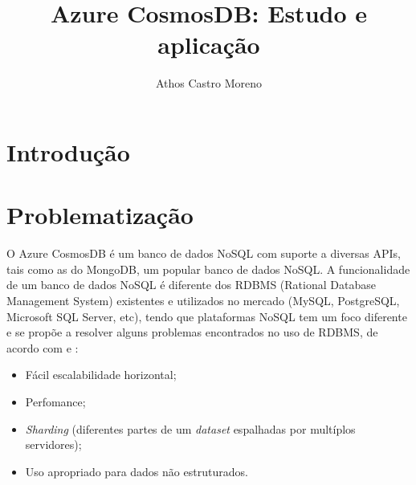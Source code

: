 \documentclass[12pt]{article}
\title{Azure CosmosDB: Estudo e aplicação}
\author{Athos Castro Moreno}
\begin{document}
 

\maketitle
     
\begin{resumo} 
\end{resumo}

\section{Introdução}

\section{Problematização} 

O Azure CosmosDB é um banco de dados NoSQL com suporte a diversas APIs, tais como as do MongoDB, um popular banco de dados NoSQL. A funcionalidade de um banco de dados NoSQL é diferente dos RDBMS (Rational Database Management System) existentes e utilizados no mercado (MySQL, PostgreSQL, Microsoft SQL Server, etc), tendo que plataformas NoSQL tem um foco diferente e se propõe a resolver alguns problemas encontrados no uso de RDBMS, de acordo com \cite{Membrey2011} e \cite{Oliveira2011}:
\begin{itemize}
	\item Fácil escalabilidade horizontal;
	\item Perfomance;
	\item \textit{Sharding} (diferentes partes de um \textit{dataset} espalhadas por multíplos servidores);
	\item Uso apropriado para dados não estruturados.
\end{itemize}


\end{document}
